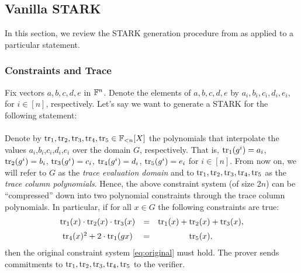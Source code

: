 \subsection{Vanilla STARK}\label{sec:vanilla-STARK}

In this section, we review the STARK generation procedure from \cite{EPRINT:StarkWare21} as applied to a particular statement.
\subsubsection*{Constraints and Trace}

Fix vectors $a,b,c,d,e$ in $\mathbb{F}^n$. Denote the elements of $a,b,c,d,e$ by $a_i,b_i,c_i,d_i,e_i$, for $i \in [n]$, respectively. Let's say we want to generate a STARK for the following statement: \\[0.2cm]
 \\[0.2cm]

Denote by $\text{tr}_1,\text{tr}_2,\text{tr}_3,\text{tr}_4,\text{tr}_5 \in \mathbb{F}_{<n}[X]$ the polynomials that interpolate the values $a_i$,$b_i$,$c_i$,$d_i$,$e_i$ over the domain $G$, respectively. That is, $\text{tr}_1(g^i) = a_i$, $\text{tr}_2(g^i) = b_i$, $\text{tr}_3(g^i) = c_i$, $\text{tr}_4(g^i) = d_i$, $\text{tr}_5(g^i) = e_i$ for $i \in [n]$. From now on, we will refer to $G$ as the \textit{trace evaluation domain} and to $\text{tr}_1,\text{tr}_2,\text{tr}_3,\text{tr}_4,\text{tr}_5$ as the \textit{trace column polynomials}.
Hence, the above constraint system (of size $2n$) can be ``compressed'' down into two polynomial constraints through the trace column polynomials. In particular, if for all $x \in G$ the following constraints are true:
\begin{align}\label{eq:constraints}
\begin{array}{ccc}
\text{tr}_1(x) \cdot \text{tr}_2(x) \cdot \text{tr}_3(x) & = & \text{tr}_1(x) + \text{tr}_2(x) + \text{tr}_3(x), \\[0.2cm]
\text{tr}_4(x)^2 + 2 \cdot \text{tr}_1(gx) & = & \text{tr}_5(x),
\end{array}
\end{align}
then the original constraint system \eqref{eq:original} must hold. The prover sends commitments to $\text{tr}_1,\text{tr}_2,\text{tr}_3,\text{tr}_4,\text{tr}_5$ to the verifier.


